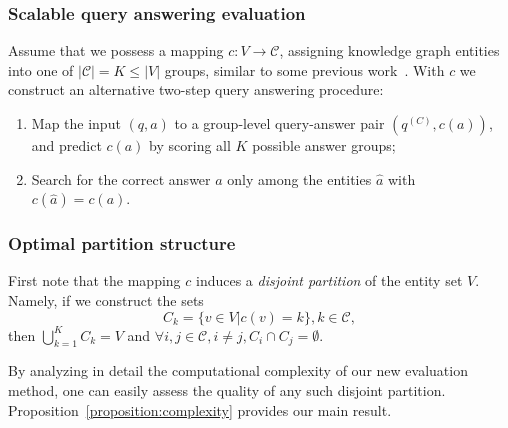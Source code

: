 \subsubsection{Scalable query answering evaluation}
 Assume that we possess a mapping $c: V \to \mathcal{C}$, assigning knowledge graph entities into one of $|\mathcal{C}| = K \leq |V|$  groups, similar to some previous work~\cite{lerer_pytorch-biggraph_2019,zheng_dgl-ke_2020}. 
With $c$ we construct an alternative two-step query answering procedure:
 \begin{enumerate}
     \item Map the input $(q, a)$ to a group-level query-answer pair $\left(q^{(C)}, c(a)\right)$, and predict $c(a)$ by scoring all $K$ possible answer groups;%
     \item Search for the correct answer $a$ only among the entities $\hat{a}$ with $c(\hat{a})=c(a)$.
 \end{enumerate}

\subsubsection{Optimal partition structure}

First note that the mapping $c$ induces a \emph{disjoint partition} of the entity set $V$. Namely, if we construct the sets $$C_k = \{v \in V|c(v)=k\}, k \in \mathcal{C},$$ then $\bigcup_{k=1}^{K}{C_k}=V$ and $\forall i,j \in \mathcal{C},i \neq j, C_i \cap C_j = \emptyset$. 

By analyzing in detail the computational complexity of our new evaluation method, one can easily assess the quality of any such disjoint partition. Proposition~\ref{proposition:complexity} provides our main result. 

